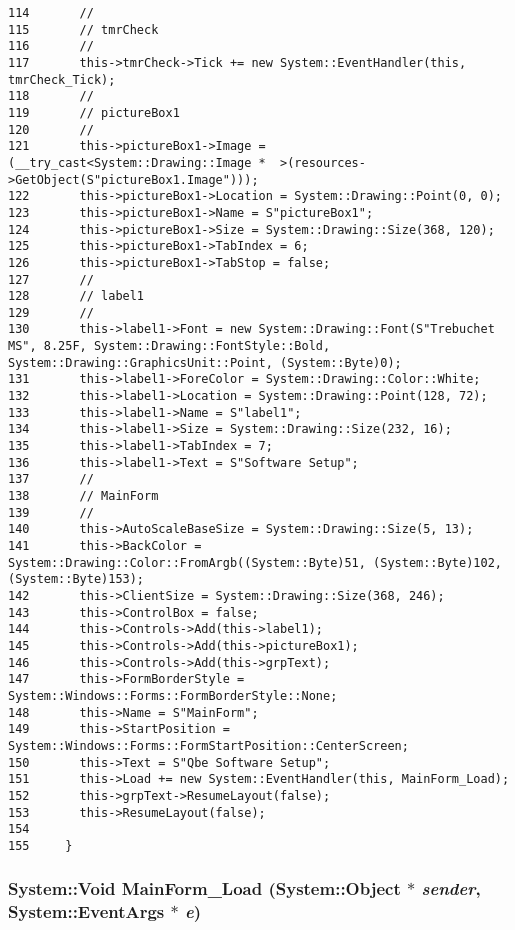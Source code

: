 \begin{verbatim}
114       // 
115       // tmrCheck
116       // 
117       this->tmrCheck->Tick += new System::EventHandler(this, tmrCheck_Tick);
118       // 
119       // pictureBox1
120       // 
121       this->pictureBox1->Image = (__try_cast<System::Drawing::Image *  >(resources->GetObject(S"pictureBox1.Image")));
122       this->pictureBox1->Location = System::Drawing::Point(0, 0);
123       this->pictureBox1->Name = S"pictureBox1";
124       this->pictureBox1->Size = System::Drawing::Size(368, 120);
125       this->pictureBox1->TabIndex = 6;
126       this->pictureBox1->TabStop = false;
127       // 
128       // label1
129       // 
130       this->label1->Font = new System::Drawing::Font(S"Trebuchet MS", 8.25F, System::Drawing::FontStyle::Bold, System::Drawing::GraphicsUnit::Point, (System::Byte)0);
131       this->label1->ForeColor = System::Drawing::Color::White;
132       this->label1->Location = System::Drawing::Point(128, 72);
133       this->label1->Name = S"label1";
134       this->label1->Size = System::Drawing::Size(232, 16);
135       this->label1->TabIndex = 7;
136       this->label1->Text = S"Software Setup";
137       // 
138       // MainForm
139       // 
140       this->AutoScaleBaseSize = System::Drawing::Size(5, 13);
141       this->BackColor = System::Drawing::Color::FromArgb((System::Byte)51, (System::Byte)102, (System::Byte)153);
142       this->ClientSize = System::Drawing::Size(368, 246);
143       this->ControlBox = false;
144       this->Controls->Add(this->label1);
145       this->Controls->Add(this->pictureBox1);
146       this->Controls->Add(this->grpText);
147       this->FormBorderStyle = System::Windows::Forms::FormBorderStyle::None;
148       this->Name = S"MainForm";
149       this->StartPosition = System::Windows::Forms::FormStartPosition::CenterScreen;
150       this->Text = S"Qbe Software Setup";
151       this->Load += new System::EventHandler(this, MainForm_Load);
152       this->grpText->ResumeLayout(false);
153       this->ResumeLayout(false);
154 
155     } 
\end{verbatim}\normalsize 
\hypertarget{classQbeNDI_1_1MainForm_QbeNDI_1_1MainFormd2}{
\subsubsection[MainForm\_\-Load]{\setlength{\rightskip}{0pt plus 5cm}System::Void Main\-Form\_\-Load (System::Object $\ast$ {\em sender}, System::Event\-Args $\ast$ {\em e})}}
\label{classQbeNDI_1_1MainForm_QbeNDI_1_1MainFormd2}




